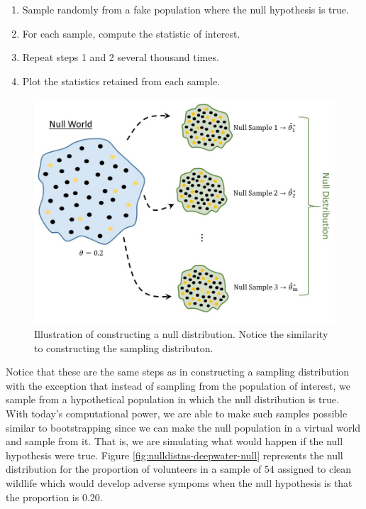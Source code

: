 \documentclass[]{book}
\providecommand{\tightlist}{%
  \setlength{\itemsep}{0pt}\setlength{\parskip}{0pt}}
\theoremstyle{definition}
\theoremstyle{definition}
\theoremstyle{definition}
\theoremstyle{remark}
\begin{document}
\begin{enumerate}
\def\labelenumi{\arabic{enumi}.}
\tightlist
\item
  Sample randomly from a fake population where the null hypothesis is
  true.
\item
  For each sample, compute the statistic of interest.
\item
  Repeat steps 1 and 2 several thousand times.
\item
  Plot the statistics retained from each sample.
\end{enumerate}

\begin{figure}

{\centering \includegraphics[width=0.8\linewidth]{./images/NullDistns-Null-Distribution} 

}

\caption{Illustration of constructing a null distribution.  Notice the similarity to constructing the sampling distributon.}\label{fig:nulldistns-null-distribution}
\end{figure}

Notice that these are the same steps as in constructing a sampling
distribution with the exception that instead of sampling from the
population of interest, we sample from a hypothetical population in
which the null distribution is true. With today's computational power,
we are able to make such samples possible similar to bootstrapping since
we can make the null population in a virtual world and sample from it.
That is, we are simulating what would happen if the null hypothesis were
true. Figure \ref{fig:nulldistns-deepwater-null} represents the null
distribution for the proportion of volunteers in a sample of 54 assigned
to clean wildlife which would develop adverse sympoms when the null
hypothesis is that the proportion is 0.20.
\end{document}
